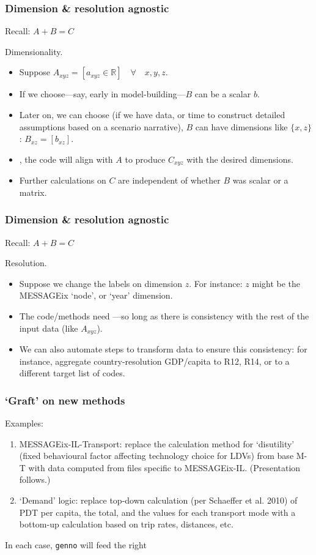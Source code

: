 \documentclass[12pt,aspectratio=169]{beamer}
\begin{document}
\begin{frame}
\frametitle{Dimension \& resolution agnostic}
Recall: $A + B = C$

\bigskip
Dimensionality.
\begin{itemize}
  \item Suppose $A_{xyz} = [ a_{xyz} \in \mathbb{R} ] \quad \forall \quad x, y, z$.
  \item If we choose—say, early in model-building—$B$ can be a scalar $b$.
  \item Later on, we can choose (if we have data, or time to construct detailed assumptions based on a scenario narrative), $B$ can have dimensions like $\{x, z\}$: $B_{xz} = [ b_{xz} ]$.
  \item {}, the code will align with $A$ to produce $C_{xyz}$ with the desired dimensions.
  \item Further calculations on $C$ are independent of whether $B$ was scalar or a matrix.
\end{itemize}
\end{frame}

\begin{frame}
\frametitle{Dimension \& resolution agnostic}
Recall: $A + B = C$

\bigskip
Resolution.
\begin{itemize}
  \item Suppose we change the labels on dimension $z$.
  For instance: $z$ might be the MESSAGEix ‘node’, or ‘year’ dimension.
  \item The code/methods need —so long as there is consistency with the rest of the input data (like $A_{xyz}$).
  \item We can also automate steps to transform data to ensure this consistency: for instance, aggregate country-resolution GDP/capita to R12, R14, or to a different target list of codes.
\end{itemize}
\end{frame}

\begin{frame}
\frametitle{‘Graft’ on new methods}

Examples:
\begin{enumerate}
  \item MESSAGEix-IL-Transport: replace the calculation method for ‘disutility’ (fixed behavioural factor affecting technology choice for LDVs) from base M-T with data computed from files specific to MESSAGEix-IL. (Presentation follows.)
  \item ‘Demand’ logic: replace top-down calculation (per Schaeffer et al. 2010) of PDT per capita, the total, and the values for each transport mode with a bottom-up calculation based on trip rates, distances, etc.
\end{enumerate}

\midskip
In each case, \texttt{genno} will feed the right

\end{frame}
\end{document}
